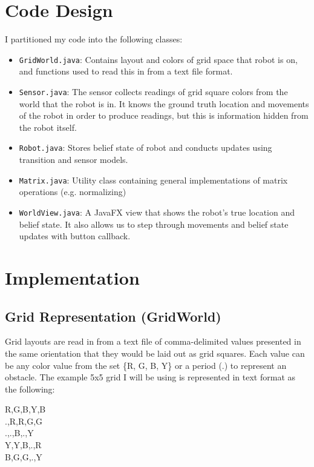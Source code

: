 \documentclass{article}
\begin{document}
\section{Code Design}

I partitioned my code into the following classes:

\begin{itemize}
\item \verb`GridWorld.java`: Contains layout and colors of grid space that robot is on, and functions used to read this in from a text file format.
\item \verb`Sensor.java`: The sensor collects readings of grid square colors from the world that the robot is in. It knows the ground truth location and movements of the robot in order to produce readings, but this is information hidden from the robot itself.
\item \verb`Robot.java`: Stores belief state of robot and conducts updates using transition and sensor models.
\item \verb`Matrix.java`: Utility class containing general implementations of matrix operations (e.g. normalizing)
\item \verb`WorldView.java`: A JavaFX view that shows the robot's true location and belief state. It also allows us to step through movements and belief state updates with button callback.
\end{itemize}

\section{Implementation}

\subsection{Grid Representation (GridWorld)}

Grid layouts are read in from a text file of comma-delimited values presented in the same orientation that they would be laid out as grid squares. Each value can be any color value from the set \{R, G, B, Y\} or a period (.) to represent an obstacle. The example 5x5 grid I will be using is represented in text format as the following:

\vspace{5mm}

{\setlength{\parindent}{0cm}
R,G,B,Y,B\\
.,R,R,G,G\\
.,.,B,.,Y\\
Y,Y,B,.,R\\
B,G,G,.,Y\\
}
\end{document}
